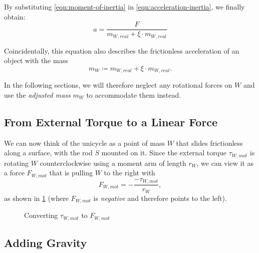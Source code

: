 \documentclass[copyright,submission]{eptcs}
\newcommand{\mi}[1]{\mathit{#1}}
\newcommand{\surface}{
    \begin{scope}[transparency group]
        \clip (-2,0) rectangle (2,-1);
        \draw[scope fading=south] (-2,0) rectangle (2,-1);
        \foreach \x in {-2,-1.75,...,3}
            \draw (\x,0) -- ($(\x,0) - (1,1)$);
    \end{scope}
}
\newcommand{\wheel}{
    \draw (0, 1) circle (1);
    \draw[fill] (0, 1) circle (0.05);
}
\begin{document}
By substituting \cref{eqn:moment-of-inertia} in \cref{eqn:acceleration-inertia}, we finally obtain:
\begin{equation}
    a = \frac{F}{m_{W, \mi{real}} + \xi \cdot m_{W, \mi{real}}}
\end{equation}

Coincidentally, this equation also describes the frictionless acceleration of an object with the mass
\begin{equation}\label{eqn:adjusted-mass}
    m_W \coloneqq m_{W, \mi{real}} + \xi \cdot m_{W, \mi{real}} .
\end{equation}

In the following sections, we will therefore neglect any rotational forces on $W$ and use the \emph{adjusted mass} $m_W$ to accommodate them instead.


\subsection{From External Torque to a Linear Force}

We can now think of the unicycle as a point of mass $W$ that slides frictionless along a surface, with the rod $S$ mounted on it. Since the external torque $\tau_{W, \mi{mot}}$ is rotating $W$ counterclockwise using a moment arm of length $r_W$, we can view it as a force $F_{W, \mi{mot}}$ that is pulling $W$ to the right with
\begin{equation}\label{eqn:defining-f-w-d}
    F_{W, \mi{mot}} = -\frac{-\tau_{W, \mi{mot}}}{r_W},
\end{equation}
as shown in \cref{fig:torque-to-force} (where $F_{W, \mi{mot}}$ is \emph{negative} and therefore points to the left).

\begin{figure}
    \centering{}
    \caption{\label{fig:torque-to-force} Converting $\tau_{W, \mi{mot}}$ to $F_{W, \mi{mot}}$}
\end{figure}


\subsection{Adding Gravity}
\end{document}
